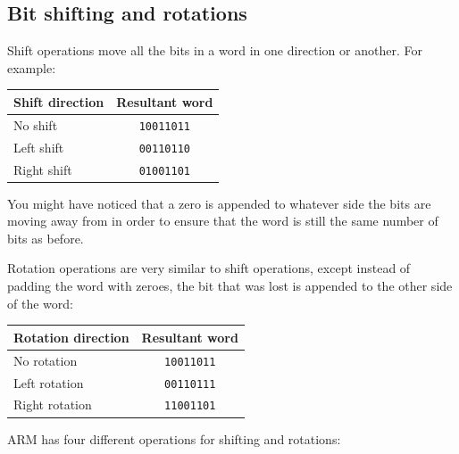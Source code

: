 \subsection{Bit shifting and rotations}
\label{subsec:bitshifting}

Shift operations move all the bits in a word in one direction or another. For
example:

\begin{center}
	\begin{tabular}{|l|c|}
		\hline
		{\bf Shift direction} & {\bf Resultant word}\\ \hline
		No shift & {\tt 10011011}\\ \hline
		Left shift & {\tt 00110110}\\ \hline
		Right shift & {\tt 01001101}\\ \hline
	\end{tabular}
\end{center}


You might have noticed that a zero is appended to whatever side the bits are
moving away from in order to ensure that the word is still the same number of
bits as before.


Rotation operations are very similar to shift operations, except instead of
padding the word with zeroes, the bit that was lost is appended to the other
side of the word:

\begin{center}
	\begin{tabular}{|l|c|}
		\hline
		{\bf Rotation direction} & {\bf Resultant word}\\ \hline
		No rotation & {\tt 10011011}\\ \hline
		Left rotation & {\tt 00110111}\\ \hline
		Right rotation & {\tt 11001101}\\ \hline
	\end{tabular}
\end{center}

ARM has four different operations for shifting and rotations:

